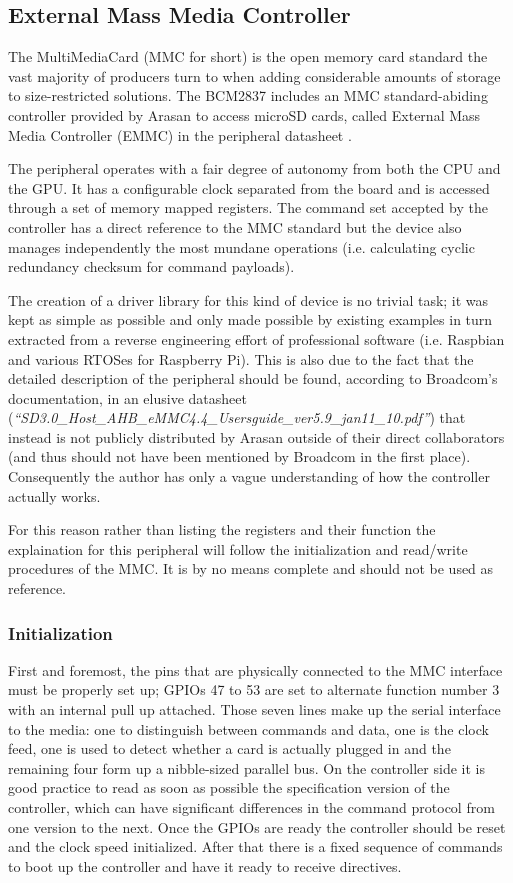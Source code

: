 \documentclass[12pt,a4paper,openright,twoside]{report}
\begin{document}
\subsection{External Mass Media Controller}
\label{emmc}
The MultiMediaCard (MMC for short) is the open memory card standard 
the vast majority of producers turn to when adding considerable amounts of 
storage to size-restricted solutions. The BCM2837 includes an MMC standard-abiding
controller provided by Arasan to access microSD cards, called External Mass Media Controller (EMMC)
in the peripheral datasheet \cite{bcm2835}.

The peripheral operates with a fair degree of autonomy from both the CPU and
the GPU. It has a configurable clock separated from the board and is accessed
through a set of memory mapped registers. The command set accepted by the controller
has a direct reference to the MMC standard but the device also manages independently
the most mundane operations (i.e. calculating cyclic redundancy checksum for
command payloads).

The creation of a driver library for this kind of device is no trivial task; it 
was kept as simple as possible and only made possible by existing examples
 in turn extracted from a reverse engineering effort
of professional software (i.e. Raspbian and various RTOSes for Raspberry Pi).
This is also due to the fact that the detailed description of the peripheral 
should be found, according to Broadcom's documentation, in an elusive datasheet 
(\textit{``SD3.0\_Host\_AHB\_eMMC4.4\_Usersguide\_ver5.9\_jan11\_10.pdf''})
 that instead is 
not publicly distributed by Arasan outside of their direct collaborators
(and thus should not have been mentioned by Broadcom in 
the first place). Consequently the author has only a vague understanding of 
how the controller actually works.

For this reason rather than listing the registers and their function the explaination
for this peripheral will follow the initialization and read/write procedures 
of the MMC. It is by no means complete and should not be used as reference.

\subsubsection{Initialization}
First and foremost, the pins that are physically connected to the MMC interface
must be properly set up; GPIOs 47 to 53 are set to alternate function number 3
with an internal pull up attached. Those seven lines make up the serial interface
to the media: one to distinguish between commands and data, one is the clock feed,
one is used to detect whether a card is actually plugged in and the remaining four
form up a nibble-sized parallel bus.
On the controller side it is good practice to read as soon as possible the specification
version of the controller, which can have significant differences in the command
 protocol from one version to the next.
Once the GPIOs are ready the controller should be reset and the clock speed initialized.
After that there is a fixed sequence of commands to boot up the controller and
have it ready to receive directives.
\end{document}
